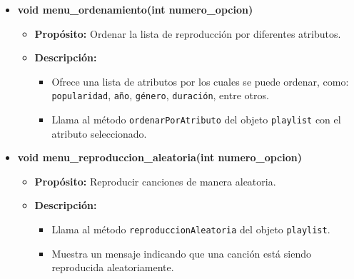 \documentclass[corference]{IEEEtran}
\begin{document}
\begin{flushleft}
\begin{itemize}
                \item \textbf{void menu\_ordenamiento(int numero\_opcion)}
                \begin{itemize}
                    \item \textbf{Propósito:} 
                    Ordenar la lista de reproducción por diferentes atributos.
                    \item \textbf{Descripción:} 
                    \begin{itemize}
                        \item Ofrece una lista de atributos por los cuales se puede ordenar, como:
                        \texttt{popularidad}, \texttt{año}, \texttt{género}, \texttt{duración}, entre otros.
                        \item Llama al método \texttt{ordenarPorAtributo} del objeto \texttt{playlist} con el atributo seleccionado.
                    \end{itemize}
                \end{itemize}
            
                \item \textbf{void menu\_reproduccion\_aleatoria(int numero\_opcion)}
                \begin{itemize}
                    \item \textbf{Propósito:} 
                    Reproducir canciones de manera aleatoria.
                    \item \textbf{Descripción:} 
                    \begin{itemize}
                        \item Llama al método \texttt{reproduccionAleatoria} del objeto \texttt{playlist}.
                        \item Muestra un mensaje indicando que una canción está siendo reproducida aleatoriamente.
                    \end{itemize}
                \end{itemize}
            

\end{itemize}
\end{flushleft}
\end{document}
